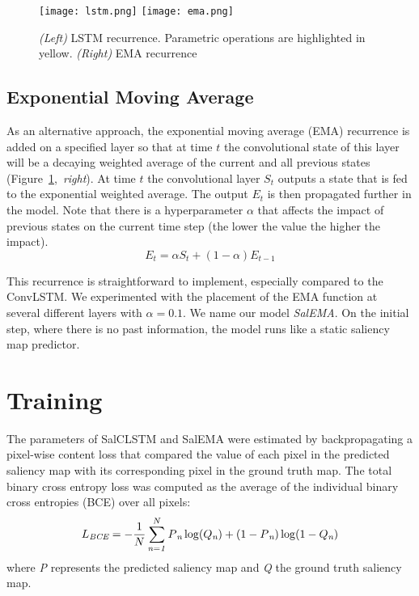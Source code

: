 \documentclass{bmvc2k}
\begin{document}
\begin{figure}[t]
\begin{center}
\texttt{[image: lstm.png]}
\texttt{[image: ema.png]}
\end{center}
\caption{\textit{(Left)} LSTM recurrence. Parametric operations are highlighted in yellow. \textit{(Right)} EMA recurrence}
\label{figEMA_LSTM}
\end{figure}

\subsection{Exponential Moving Average} 
As an alternative approach, the exponential moving average (EMA) recurrence \cite{EMA} is added on a specified layer so that at time $t$ the convolutional state of this layer will be a decaying weighted average of the current and all previous states (Figure~\ref{figEMA_LSTM},~\textit{right}). At time $t$ the convolutional layer $S_t$ outputs a state that is fed to the exponential weighted average. The output $E_t$ is then propagated further in the model. Note that there is a hyperparameter $\alpha$ that affects the impact of previous states on the current time step (the lower the value the higher the impact).
\begin{equation}
E_t = \alpha S_t + (1-\alpha)E_{t-1}
\end{equation}

This recurrence is straightforward to implement, especially compared to the ConvLSTM. We experimented with the placement of the EMA function at several different layers with $\alpha=0.1$. We name our model \textit{SalEMA}. On the initial step, where there is no past information, the model runs like a static saliency map predictor. 



\section{Training}

The parameters of SalCLSTM and SalEMA were estimated by backpropagating a pixel-wise content loss that compared the value of each pixel in the predicted saliency map with its corresponding pixel in the ground truth map. The total binary cross entropy loss was computed as the average of the individual binary cross entropies (BCE) over all pixels:
\begin{equation}
L\textsubscript{\it BCE} = -\frac{1}{N}\sum_{\it n=1}^{N}P\textsubscript{\it n} \log(Q\textsubscript{\it n})+(1-P\textsubscript{\it n}) \log(1-Q\textsubscript{\it n})
\end{equation}
where \textit{P} represents the predicted saliency map and {\it Q} the ground truth saliency map.
\end{document}
